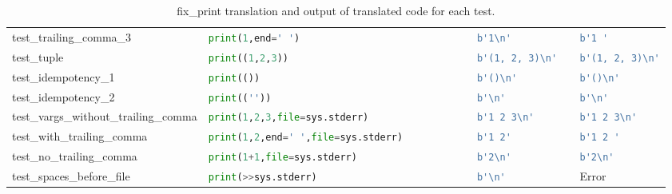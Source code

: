 \begin{table}[ht]
\begin{tabular}{@{}l|lll@{}}
    test\_trailing\_comma\_3              & \lstinline[language=Python, style=pythonstyle]|print(1,end=' ')                             | & \lstinline[language=Python, style=pythonstyle]|b'1\n'  |                & \lstinline[language=Python, style=pythonstyle]|b'1 '         |                \\
    test\_tuple                           & \lstinline[language=Python, style=pythonstyle]|print((1,2,3))                               | & \lstinline[language=Python, style=pythonstyle]|b'(1, 2, 3)\n'  |        & \lstinline[language=Python, style=pythonstyle]|b'(1, 2, 3)\n'| \\
    test\_idempotency\_1                  & \lstinline[language=Python, style=pythonstyle]|print(())                                    | & \lstinline[language=Python, style=pythonstyle]|b'()\n'   |              & \lstinline[language=Python, style=pythonstyle]|b'()\n'       | \\
    test\_idempotency\_2                  & \lstinline[language=Python, style=pythonstyle]|print((''))                                  | & \lstinline[language=Python, style=pythonstyle]|b'\n' |                  & \lstinline[language=Python, style=pythonstyle]|b'\n'         | \\
    test\_vargs\_without\_trailing\_comma & \lstinline[language=Python, style=pythonstyle]|print(1,2,3,file=sys.stderr)                 | & \lstinline[language=Python, style=pythonstyle]|b'1 2 3\n'    |          & \lstinline[language=Python, style=pythonstyle]|b'1 2 3\n'    | \\
    test\_with\_trailing\_comma           & \lstinline[language=Python, style=pythonstyle]|print(1,2,end=' ',file=sys.stderr)           | & \lstinline[language=Python, style=pythonstyle]|b'1 2'|                                 & \lstinline[language=Python, style=pythonstyle]|b'1 2 '       |                \\
    test\_no\_trailing\_comma             & \lstinline[language=Python, style=pythonstyle]|print(1+1,file=sys.stderr)                   | & \lstinline[language=Python, style=pythonstyle]|b'2\n' |                 & \lstinline[language=Python, style=pythonstyle]|b'2\n'        | \\
    test\_spaces\_before\_file            & \lstinline[language=Python, style=pythonstyle]|print(>>sys.stderr)| & \lstinline[language=Python, style=pythonstyle]|b'\n'|                   & Error                         \\ \bottomrule
    \end{tabular}
    \caption{fix\_print translation and output of translated code for each test.}
\end{table}

